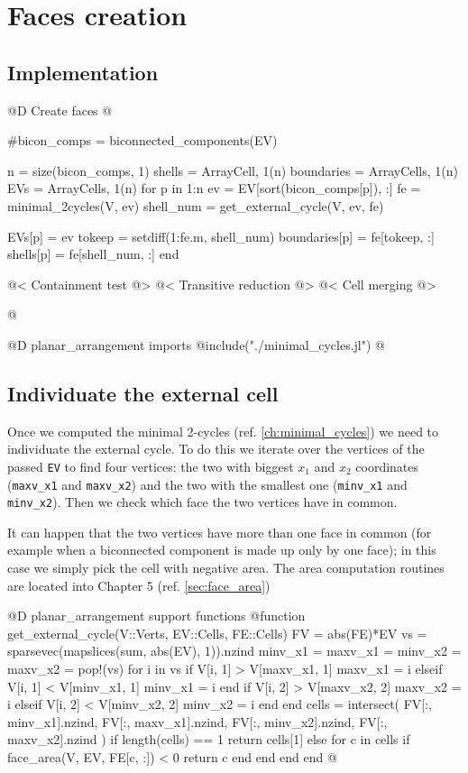 \section{Faces creation}
\subsection{Implementation}
@D Create faces
@{#bicon_comps = biconnected_components(EV)

n = size(bicon_comps, 1)
shells = Array{Cell, 1}(n)
boundaries = Array{Cells, 1}(n)
EVs = Array{Cells, 1}(n)
for p in 1:n
    ev = EV[sort(bicon_comps[p]), :]
    fe = minimal_2cycles(V, ev)
    shell_num = get_external_cycle(V, ev, fe)

    EVs[p] = ev 
    tokeep = setdiff(1:fe.m, shell_num)
    boundaries[p] = fe[tokeep, :]
    shells[p] = fe[shell_num, :]
end

@< Containment test @>
@< Transitive reduction @>
@< Cell merging @>

@}

@D planar\_arrangement imports
@{include("./minimal_cycles.jl")
@}

\subsection{Individuate the external cell}
Once we computed the minimal 2-cycles (ref. \ref{ch:minimal_cycles})
we need to individuate the external cycle. To do this we iterate over the
vertices of the passed \texttt{EV} to find four vertices: the two with biggest
$x_1$ and $x_2$ coordinates (\texttt{maxv\_x1} and \texttt{maxv\_x2}) and the 
two with the smallest one (\texttt{minv\_x1} and \texttt{minv\_x2}). 
Then we check which face the two vertices have in common. 

It can happen that the two vertices have more than one face in common
(for example when a biconnected component is made up only by one face);
in this case we simply pick the cell with negative area. The area
computation routines are located into Chapter 5 (ref. \ref{sec:face_area})


@D planar\_arrangement support functions
@{function get_external_cycle(V::Verts, EV::Cells, FE::Cells)
    FV = abs(FE)*EV
    vs = sparsevec(mapslices(sum, abs(EV), 1)).nzind
    minv_x1 = maxv_x1 = minv_x2 = maxv_x2 = pop!(vs)
    for i in vs
        if V[i, 1] > V[maxv_x1, 1]
            maxv_x1 = i
        elseif V[i, 1] < V[minv_x1, 1]
            minv_x1 = i
        end
        if V[i, 2] > V[maxv_x2, 2]
            maxv_x2 = i
        elseif V[i, 2] < V[minv_x2, 2]
            minv_x2 = i
        end
    end
    cells = intersect(
        FV[:, minv_x1].nzind, 
        FV[:, maxv_x1].nzind,
        FV[:, minv_x2].nzind,
        FV[:, maxv_x2].nzind
    )
    if length(cells) == 1
        return cells[1]
    else
        for c in cells
            if face_area(V, EV, FE[c, :]) < 0
                return c
            end
        end
    end
end
@}

